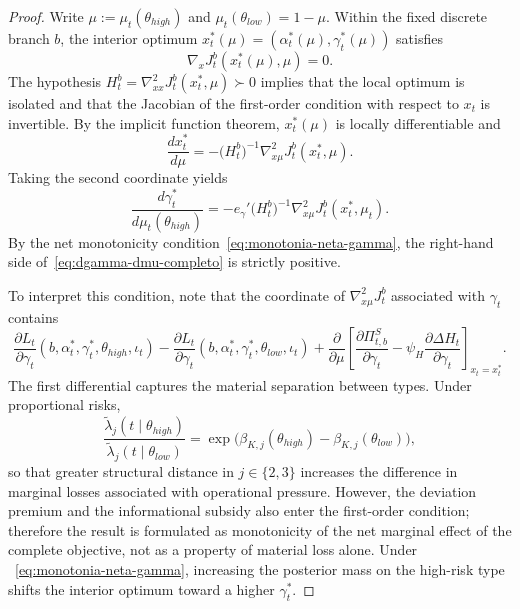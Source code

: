 \documentclass[12pt]{article}
\numberwithin{equation}{section}
\numberwithin{table}{section}
\theoremstyle{definition}
\begin{document}
\begin{proof}
Write $\mu:=\mu_t(\theta_{high})$ and
$\mu_t(\theta_{low})=1-\mu$. Within the fixed discrete branch $b$, the interior
optimum $x_t^\ast(\mu)=(\alpha_t^\ast(\mu),\gamma_t^\ast(\mu))$ satisfies
\begin{equation}
\label{eq:foc-rama-completa}
\nabla_x J_t^b(x_t^\ast(\mu),\mu)=0.
\end{equation}
The hypothesis $H_t^b=\nabla_{xx}^2J_t^b(x_t^\ast,\mu)\succ0$ implies that the
local optimum is isolated and that the Jacobian of the first-order condition
with respect to $x_t$ is invertible. By the implicit function theorem,
$x_t^\ast(\mu)$ is locally differentiable and
\begin{equation}
\label{eq:dx-dmu-completo}
\frac{d x_t^\ast}{d\mu}
=
-\bigl(H_t^b\bigr)^{-1}\nabla_{x\mu}^2J_t^b(x_t^\ast,\mu).
\end{equation}
Taking the second coordinate yields
\begin{equation}
\label{eq:dgamma-dmu-completo}
\frac{d\gamma_t^\ast}{d\mu_t(\theta_{high})}
=
-e_\gamma'
\bigl(H_t^b\bigr)^{-1}
\nabla_{x\mu}^2J_t^b(x_t^\ast,\mu_t).
\end{equation}
By the net monotonicity condition~\eqref{eq:monotonia-neta-gamma}, the right-hand
side of~\eqref{eq:dgamma-dmu-completo} is strictly positive.

To interpret this condition, note that the coordinate of
$\nabla_{x\mu}^2J_t^b$ associated with $\gamma_t$ contains
\begin{equation}
\label{eq:efecto-neto-gamma}
\frac{\partial L_t}{\partial\gamma_t}
(b,\alpha_t^\ast,\gamma_t^\ast,\theta_{high},\iota_t)
-
\frac{\partial L_t}{\partial\gamma_t}
(b,\alpha_t^\ast,\gamma_t^\ast,\theta_{low},\iota_t)
+
\frac{\partial}{\partial\mu}
\left[
\frac{\partial \Pi_{t,b}^{S}}{\partial\gamma_t}
-\psi_H
\frac{\partial \Delta H_t}{\partial\gamma_t}
\right]_{x_t=x_t^\ast}.
\end{equation}
The first differential captures the material separation between types. Under
proportional risks,
\[
\frac{\tilde\lambda_j(t\mid\theta_{high})}
     {\tilde\lambda_j(t\mid\theta_{low})}
=
\exp\!\bigl(\beta_{K,j}(\theta_{high})
-\beta_{K,j}(\theta_{low})\bigr),
\]
so that greater structural distance in $j\in\{2,3\}$ increases the difference
in marginal losses associated with operational pressure. However, the deviation
premium and the informational subsidy also enter the first-order condition;
therefore the result is formulated as monotonicity of the net marginal effect
of the complete objective, not as a property of material loss alone. Under
~\eqref{eq:monotonia-neta-gamma}, increasing the posterior mass on the
high-risk type shifts the interior optimum toward a higher $\gamma_t^\ast$.
\end{proof}
\end{document}
